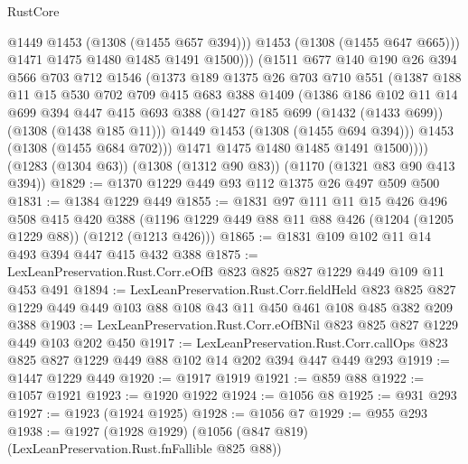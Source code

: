 \begin{lexlean}{RustCore}
\begin{coremodule}
                  @1449
                  @1453
                  (@1308 (@1455 @657 @394)))
                @1453
                (@1308 (@1455 @647 @665)))
              @1471
              @1475
              @1480
              @1485
              @1491
              @1500)))
        (@1511
          @677
          @140
          @190
          @26
          @394
          @566
          @703
          @712
          @1546
          (@1373
            @189
            @1375
            @26
            @703
            @710
            @551
            (@1387
              @188
              @11
              @15
              @530
              @702
              @709
              @415
              @683
              @388
              @1409
              (@1386
                @186
                @102
                @11
                @14
                @699
                @394
                @447
                @415
                @693
                @388
                (@1427 @185 @699 (@1432 (@1433 @699)) (@1308 (@1438 @185 @11)))
                @1449
                @1453
                (@1308 (@1455 @694 @394)))
              @1453
              (@1308 (@1455 @684 @702)))
            @1471
            @1475
            @1480
            @1485
            @1491
            @1500))))
    (@1283 (@1304 @63))
    (@1308 (@1312 @90 @83))
    (@1170 (@1321 @83 @90 @413 @394))
@1829 := @1370 @1229 @449 @93 @112 @1375 @26 @497 @509 @500
@1831 := @1384 @1229 @449
@1855 := @1831
    @97
    @111
    @11
    @15
    @426
    @496
    @508
    @415
    @420
    @388
    (@1196 @1229 @449 @88 @11 @88 @426 (@1204 (@1205 @1229 @88)) (@1212 (@1213 @426)))
@1865 := @1831 @109 @102 @11 @14 @493 @394 @447 @415 @432 @388
@1875 := LexLeanPreservation.Rust.Corr.eOfB @823 @825 @827 @1229 @449 @109 @11 @453 @491
@1894 := LexLeanPreservation.Rust.Corr.fieldHeld
    @823
    @825
    @827
    @1229
    @449
    @449
    @103
    @88
    @108
    @43
    @11
    @450
    @461
    @108
    @485
    @382
    @209
    @388
@1903 := LexLeanPreservation.Rust.Corr.eOfBNil @823 @825 @827 @1229 @449 @103 @202 @450
@1917 := LexLeanPreservation.Rust.Corr.callOps
    @823
    @825
    @827
    @1229
    @449
    @88
    @102
    @14
    @202
    @394
    @447
    @449
    @293
@1919 := @1447 @1229 @449
@1920 := @1917 @1919
@1921 := @859 @88
@1922 := @1057 @1921
@1923 := @1920 @1922
@1924 := @1056 @8
@1925 := @931 @293
@1927 := @1923 (@1924 @1925)
@1928 := @1056 @7
@1929 := @955 @293
@1938 := @1927 (@1928 @1929) (@1056 (@847 @819) (LexLeanPreservation.Rust.fnFallible @825 @88))

\end{coremodule}
\end{lexlean}
